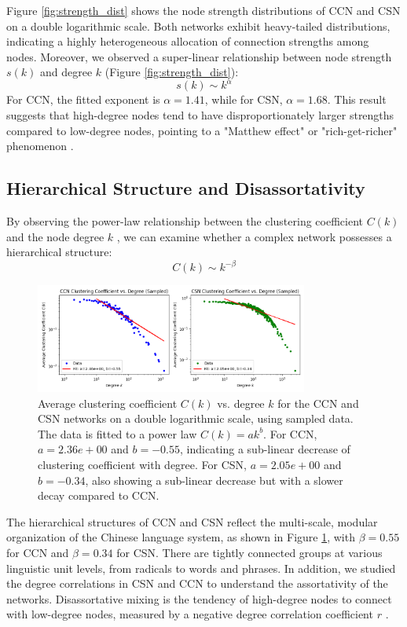 \documentclass[11pt]{article}
\begin{document}
    Figure \ref{fig:strength_dist} shows the node strength distributions of CCN and CSN on a double logarithmic scale. Both networks exhibit heavy-tailed distributions, indicating a highly heterogeneous allocation of connection strengths among nodes. 
    Moreover, we observed a super-linear relationship between node strength $s(k)$ and degree $k$ (Figure \ref{fig:strength_dist}):
    \begin{equation}
    s(k) \sim k^{\alpha}
    \end{equation}
    For CCN, the fitted exponent is $\alpha=1.41$, while for CSN, $\alpha=1.68$. This result suggests that high-degree nodes tend to have disproportionately larger strengths compared to low-degree nodes, pointing to a "Matthew effect" or "rich-get-richer" phenomenon \cite{barabasi1999emergence}.
\subsection{Hierarchical Structure and Disassortativity}
By observing the power-law relationship between the clustering coefficient $C(k)$ and the node degree $k$ \cite{ravasz2003hierarchical}, we can examine whether a complex network possesses a hierarchical structure:
\begin{equation}
C(k) \sim k^{-\beta}
\end{equation}
\begin{figure}[htbp]
    \centering
    \includegraphics[width=0.8\textwidth]{../analysis/clustering coefficient/clustering coefficient.png}
    \caption{Average clustering coefficient $C(k)$ vs. degree $k$ for the CCN and CSN networks on a double logarithmic scale, using sampled data. The data is fitted to a power law $C(k) = ak^b$. For CCN, $a=2.36e+00$ and $b=-0.55$, indicating a sub-linear decrease of clustering coefficient with degree. For CSN, $a=2.05e+00$ and $b=-0.34$, also showing a sub-linear decrease but with a slower decay compared to CCN.}
    \label{fig:hierarchical}
    \end{figure}
    The hierarchical structures of CCN and CSN reflect the multi-scale, modular organization of the Chinese language system, as shown in Figure \ref{fig:hierarchical}, with $\beta=0.55$ for CCN and $\beta=0.34$ for CSN. There are tightly connected groups at various linguistic unit levels, from radicals to words and phrases.
    In addition, we studied the degree correlations in CSN and CCN to understand the assortativity of the networks. Disassortative mixing is the tendency of high-degree nodes to connect with low-degree nodes, measured by a negative degree correlation coefficient $r$ \cite{newman2002assortative}.
    
\end{document}
